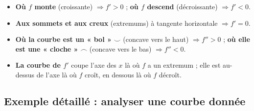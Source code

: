 \documentclass[11pt,a4paper]{article}
\begin{document}
\begin{commentfaire}
\begin{itemize}[leftmargin=1.8em,topsep=2pt,itemsep=2pt]
  \item \textbf{Où $f$ monte} (croissante) $\Rightarrow f'>0$ ; \textbf{où $f$ descend} (décroissante)
        $\Rightarrow f'<0$.
  \item \textbf{Aux sommets et aux creux} (extremums) à tangente horizontale $\Rightarrow f'=0$.
  \item \textbf{Où la courbe est un « bol »} $\smallsmile$ (concave vers le haut) $\Rightarrow f''>0$ ;
        \textbf{où elle est une « cloche »} $\smallfrown$ (concave vers le bas) $\Rightarrow f''<0$.
  \item \textbf{La courbe de $f'$} coupe l'axe des $x$ là où $f$ a un extremum ; elle est au-dessus
        de l'axe là où $f$ croît, en dessous là où $f$ décroît.
\end{itemize}
\end{commentfaire}

\subsection{Exemple détaillé : analyser une courbe donnée}
\end{document}
